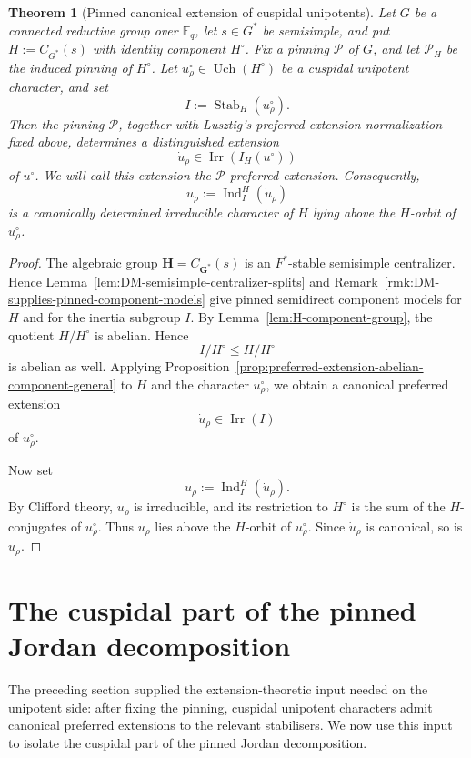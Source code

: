 \documentclass{amsart}
\theoremstyle{plain}
\numberwithin{equation}{section}
\newtheorem{theorem}{Theorem}[section]
\theoremstyle{definition}
\newcommand{\cP}{\mathcal{P}}
\newcommand{\Ind}{\operatorname{Ind}}
\newcommand{\Irr}{\operatorname{Irr}}
\newcommand{\Uch}{\operatorname{Uch}}
\newcommand{\Stab}{\operatorname{Stab}}
\newcommand{\bG}{\mathbf{G}}
\newcommand{\bH}{\mathbf{H}}
\newcommand{\F}{\mathbb{F}}
\begin{document}
\begin{theorem}[Pinned canonical extension of cuspidal unipotents]
\label{thm:pinned-canonical-extension}
Let \(G\) be a connected reductive group over \(\F_q\), let \(s\in G^*\) be semisimple, and put \(H:=C_{G^*}(s)\) with identity component \(H^\circ\). Fix a pinning \(\cP\) of \(G\), and let \(\cP_H\) be the induced pinning of \(H^\circ\). Let \(u_\rho^\circ\in \Uch(H^\circ)\) be a cuspidal unipotent character, and set
\[
I:=\Stab_H(u_\rho^\circ).
\]
Then the pinning \(\cP\), together with Lusztig's preferred-extension
normalization fixed above, determines a distinguished extension
\[
        \dot u_\rho\in \Irr(I_H(u^\circ))
\]
of \(u^\circ\).  We will call this extension the \(\cP\)-preferred extension.
Consequently,
\[
u_\rho:=\Ind_I^H(\dot u_\rho)
\]
is a canonically determined irreducible character of \(H\) lying above the \(H\)-orbit of
\(u_\rho^\circ\).
\end{theorem}

\begin{proof}
The algebraic group \(\bH=C_{\bG^*}(s)\) is an \(F^*\)-stable semisimple centralizer.
Hence Lemma~\ref{lem:DM-semisimple-centralizer-splits} and
Remark~\ref{rmk:DM-supplies-pinned-component-models} give pinned semidirect component models for
\(H\) and for the inertia subgroup \(I\).  By Lemma~\ref{lem:H-component-group}, the quotient
\(H/H^\circ\) is abelian. Hence
\[
I/H^\circ \le H/H^\circ
\]
is abelian as well. Applying Proposition~\ref{prop:preferred-extension-abelian-component-general}
to \(H\) and the character \(u_\rho^\circ\), we obtain a canonical preferred
extension
\[
\dot u_\rho\in \Irr(I)
\]
of \(u_\rho^\circ\).

Now set
\[
u_\rho:=\Ind_I^H(\dot u_\rho).
\]
By Clifford theory, \(u_\rho\) is irreducible, and its restriction to \(H^\circ\) is the sum of the
\(H\)-conjugates of \(u_\rho^\circ\). Thus \(u_\rho\) lies above the \(H\)-orbit of \(u_\rho^\circ\).
Since \(\dot u_\rho\) is canonical, so is \(u_\rho\).
\end{proof}
\medskip
\section{The cuspidal part of the pinned Jordan decomposition}
\label{sec:cuspidal-pinned-JD}
The preceding section supplied the extension-theoretic input needed on the
unipotent side: after fixing the pinning, cuspidal unipotent characters admit
canonical preferred extensions to the relevant stabilisers.  We now use this
input to isolate the cuspidal part of the pinned Jordan decomposition.
\end{document}
